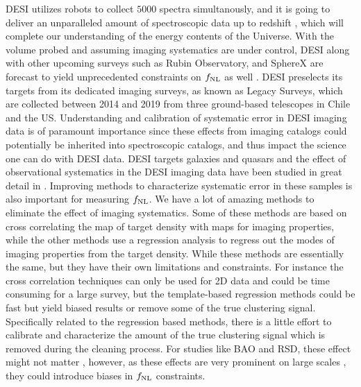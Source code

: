  DESI utilizes robots to collect $5000$ spectra simultanously, and it is going to deliver an unparalleled amount of spectroscopic data up to redshift , which will complete our understanding of the energy contents of the Universe. With the volume probed and assuming imaging systematics are under control, DESI along with other upcoming surveys such as Rubin Observatory, and SphereX are forecast to yield unprecedented constraints on $f_{\rm NL}$ as well . DESI preselects its targets from its dedicated imaging surveys, as known as Legacy Surveys, which are collected between 2014 and 2019 from three ground-based telescopes in Chile and the US. Understanding and calibration of systematic error in DESI imaging data is of paramount importance since these effects from imaging catalogs could potentially be inherited into spectroscopic catalogs, and thus impact the science one can do with DESI data. DESI targets galaxies and quasars and the effect of observational systematics in the DESI imaging data have been studied in great detail in . Improving methods to characterize systematic error in these samples is also important for measuring $f_{\rm NL}$. We have a lot of amazing methods to eliminate the effect of imaging systematics. Some of these methods are based on cross correlating the map of target density with maps for imaging properties, while the other methods use a regression analysis to regress out the modes of imaging properties from the target density. While these methods are essentially the same, but they have their own limitations and constraints. For instance the cross correlation techniques can only be used for 2D data and could be time consuming for a large survey, but the template-based regression methods could be fast but yield biased results or remove some of the true clustering signal. Specifically related to the regression based methods, there is a little effort to calibrate and characterize the amount of the true clustering signal which is removed during the cleaning process. For studies like BAO and RSD, these effect might not matter , however, as these effects are very prominent on large scales , they could introduce biases in $f_{\rm NL}$ constraints.  
 
